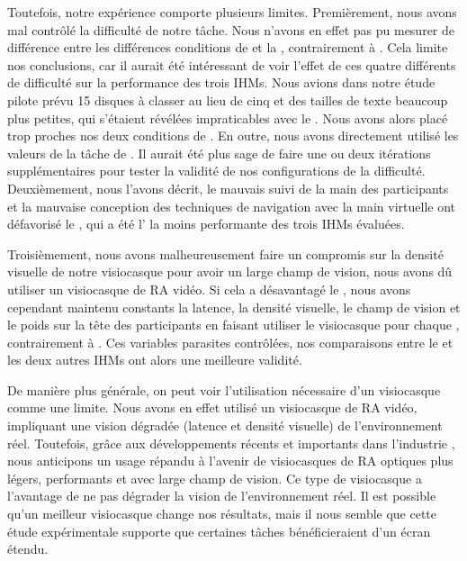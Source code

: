 Toutefois, notre expérience comporte plusieurs limites. Premièrement, nous avons mal contrôlé la difficulté de notre tâche. Nous n'avons en effet pas pu mesurer de différence entre les différences conditions de  et la , contrairement à \cite{Liu2014}. Cela limite nos conclusions, car il aurait été intéressant de voir l'effet de ces quatre différents  de difficulté sur la performance des trois IHMs. Nous avions dans notre étude pilote prévu 15 disques à classer au lieu de cinq et des tailles de texte beaucoup plus petites, qui s'étaient révélées impraticables avec le . Nous avons alors placé trop proches nos deux conditions de . En outre, nous avons directement utilisé les valeurs  de la tâche de \citeauthor{Liu2014}. Il aurait été plus sage de faire une ou deux itérations supplémentaires pour tester la validité de nos configurations de la difficulté. Deuxièmement, nous l'avons décrit, le mauvais suivi de la main des participants et la mauvaise conception des techniques de navigation avec la main virtuelle ont défavorisé le , qui a été l' la moins performante des trois IHMs évaluées.

Troisièmement, nous avons malheureusement faire un compromis sur la densité visuelle de notre visiocasque pour avoir un large champ de vision, nous avons dû utiliser un visiocasque de RA vidéo. Si cela a désavantagé le , nous avons cependant maintenu constants la latence, la densité visuelle, le champ de vision et le poids sur la tête des participants en faisant utiliser le visiocasque pour chaque , contrairement à \cite{Grubert2015}. Ces variables parasites contrôlées, nos comparaisons entre le  et les deux autres IHMs ont alors une meilleure validité.

De manière plus générale, on peut voir l'utilisation nécessaire d'un visiocasque comme une limite. Nous avons en effet utilisé un visiocasque de RA vidéo, impliquant une vision dégradée (latence et densité visuelle) de l'environnement réel. Toutefois, grâce aux développements récents et importants dans l'industrie , nous anticipons un usage répandu à l'avenir de visiocasques de RA optiques plus légers, performants et avec large champ de vision. Ce type de visiocasque a l'avantage de ne pas dégrader la vision de l'environnement réel. Il est possible qu'un meilleur visiocasque change nos résultats, mais il nous semble que cette étude expérimentale supporte que certaines tâches bénéficieraient d'un écran étendu.



